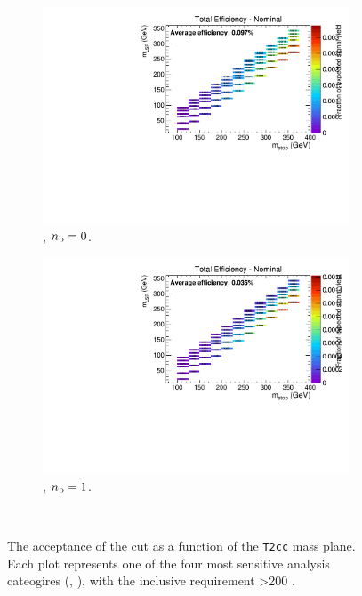 \begin{figure}[h!]
\begin{subfigure}[b]{0.4\textwidth}
    \includegraphics[width=\textwidth, page=3]{Figs/sms/t2cc/v24/MHT_MET_T2cc_v24_eq0b_ge4j_incl.pdf}
    \caption{\njhigh, $n_{\text{b}} = 0$.}
  \end{subfigure}
  \begin{subfigure}[b]{0.4\textwidth}
    \includegraphics[width=\textwidth, page=3]{Figs/sms/t2cc/v24/MHT_MET_T2cc_v24_eq1b_ge4j_incl.pdf}
    \caption{\njhigh, $n_{\text{b}} = 1$.}
  \end{subfigure}\\
  \caption{The acceptance of the \mhtmet cut as a function of the \texttt{T2cc}
  mass plane. Each plot represents one of the four most sensitive 
  analysis cateogires (\nb, \nj), with the inclusive requirement \HT>200 \gev.}
  \label{fig:sms-mhtmet-t2cc}
\end{figure}


